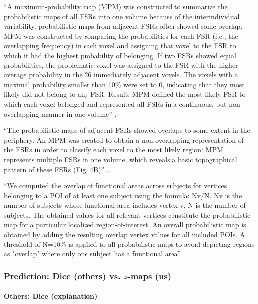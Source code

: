 ``A maximum-probability map (MPM) was constructed to summarize the probabilistic
maps of all FSRs into one volume because of the interindividual variability,
probabilistic maps from adjacent FSRs often showed some overlap.
%
MPM was constructed by comparing the probabilities for each FSR (i.e., the
overlapping frequency) in each voxel and assigning that voxel to the FSR to
which it had the highest probability of belonging.
%
If two FSRs showed equal probabilities, the problematic voxel was assigned to
the FSR with the higher average probability in the 26 immediately adjacent
voxels.
%
The voxels with a maximal probability smaller than 10\% were set to 0,
indicating that they most likely did not belong to any FSR.
%
Result: MPM defined the most likely FSR to which each voxel belonged and
represented all FSRs in a continuous, but non-overlapping manner in one
volume'' \citep{zhen2015quantifying}.


``The probabilistic maps of adjacent FSRs showed overlaps to some extent in the
periphery.
%
An MPM was created to obtain a non-overlapping representation of the FSRs in
order to classify each voxel to the most likely region:
%
MPM represents multiple FSRs in one volume, which reveals a basic topographical
pattern of these FSRs (Fig. 4B)'' \citet{zhen2015quantifying}.



``We computed the overlap of functional areas across subjects for vertices
belonging to a POI of at least one subject using the formula: Nv/N.
%
Nv is the number of subjects whose functional area includes vertex v,
%
N is the number of subjects.
%
The obtained values for all relevant vertices constitute the probabilistic map
for a particular localized region-of-interest.
%
An overall probabilistic map is obtained by adding the resulting overlap vertex
values for all included POIs.
%
A threshold of N=10\% is applied to all probabilistic maps to avoid depicting
regions as "overlap" where only one subject has a functional area''
\citep{frost2012measuring}.



\subsubsection{Prediction: Dice (others) vs. $z$-maps (us)}





\paragraph{Others: Dice (explanation)}

